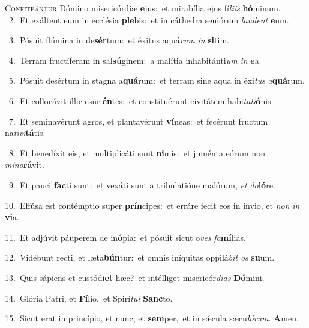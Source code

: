\lettrine{\initial\textcolor{\initialcolor}{C}}{onfiteántur} Dómino misericórdiæ \textbf{e}\-jus:~\star et mirabília ejus fí\-\textit{li}\-\textit{is} \textbf{hó}\-minum.\\
{\numbfont\textcolor{\numbcolor}{~2.}}~Et exáltent eum in ecclésia \textbf{ple}\-bis:~\star et in cáthedra seniórum \textit{lau}\-\textit{dent} \textbf{e}\-um.\par
{\numbfont\textcolor{\numbcolor}{~3.}}~Pósuit flúmina in de\-\textbf{sér}\-tum:~\star et éxitus aquá\textit{rum} \textit{in} \textbf{si}\-tim.\par
{\numbfont\textcolor{\numbcolor}{~4.}}~Terram fructíferam in sal\-\textbf{sú}\-ginem:~\star a malítia inhabitánti\textit{um} \textit{in} \textbf{e}\-a.\par
{\numbfont\textcolor{\numbcolor}{~5.}}~Pósuit desértum in stagna a\-\textbf{quá}\-rum:~\star et terram sine aqua in éxi\textit{tus} \textit{a}\-\textbf{quá}rum.\par
{\numbfont\textcolor{\numbcolor}{~6.}}~Et collocávit illic esuri\-\textbf{én}\-tes:~\star et constituérunt civitátem habi\-\textit{ta}\-\textit{ti}\textbf{ó}nis.\par
{\numbfont\textcolor{\numbcolor}{~7.}}~Et seminavérunt agros, et plantavérunt \textbf{ví}\-neas:~\star et fecérunt fructum na\-\textit{ti}\-\textit{vi}\textbf{tá}tis.\par
{\numbfont\textcolor{\numbcolor}{~8.}}~Et benedíxit eis, et multiplicáti sunt \textbf{ni}\-mis:~\star et juménta eórum non \textit{mi}\-\textit{no}\textbf{rá}vit.\par
{\numbfont\textcolor{\numbcolor}{~9.}}~Et pauci \textbf{fac}\-ti sunt:~\star et vexáti sunt a tribulatióne malórum, \textit{et} \textit{do}\-\textbf{ló}re.\par
{\numbfont\textcolor{\numbcolor}{10.}}~Effúsa est contémptio super \textbf{prín}\-cipes:~\star et erráre fecit eos in ínvio, et \textit{non} \textit{in} \textbf{vi}\-a.\par
{\numbfont\textcolor{\numbcolor}{11.}}~Et adjúvit páuperem de in\-\textbf{ó}\-pia:~\star et pósuit sicut o\textit{ves} \textit{fa}\-\textbf{mí}lias.\par
{\numbfont\textcolor{\numbcolor}{12.}}~Vidébunt recti, et læta\-\textbf{bún}\-tur:~\star et omnis iníquitas oppilá\textit{bit} \textit{os} \textbf{su}\-um.\par
{\numbfont\textcolor{\numbcolor}{13.}}~Quis sápiens et custódi\textbf{et} hæc?~\star et intélliget misericór\-\textit{di}\-\textit{as} \textbf{Dó}\-mini.\par
{\numbfont\textcolor{\numbcolor}{14.}}~Glória Patri, et \textbf{Fí}\-lio,~\star et Spirí\-\textit{tu}\-\textit{i} \textbf{Sanc}\-to.\par
{\numbfont\textcolor{\numbcolor}{15.}}~Sicut erat in princípio, et nunc, et \textbf{sem}\-per,~\star et in sǽcula sæcu\-\textit{ló}\-\textit{rum}. \textbf{A}\-men.\par
